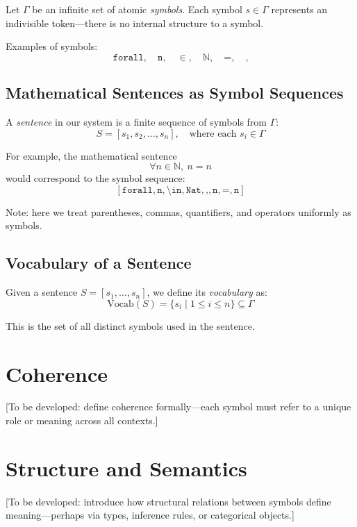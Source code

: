 \documentclass{article}
\theoremstyle{definition}
\begin{document}
Let $\Gamma$ be an infinite set of atomic \emph{symbols}. Each symbol $s \in \Gamma$ represents an indivisible token—there is no internal structure to a symbol.

Examples of symbols:
\[
\texttt{forall}, \quad \texttt{n}, \quad \in, \quad \mathbb{N}, \quad \texttt{=}, \quad \texttt{,}
\]

\subsection{Mathematical Sentences as Symbol Sequences}

A \emph{sentence} in our system is a finite sequence of symbols from $\Gamma$:
\[
S = [s_1, s_2, \dots, s_n], \quad \text{where each } s_i \in \Gamma
\]

For example, the mathematical sentence
\[
\forall n \in \mathbb{N}, \ n = n
\]
would correspond to the symbol sequence:
\[
[\texttt{forall}, \texttt{n}, \texttt{\textbackslash in}, \texttt{Nat}, \texttt{,}, \texttt{n}, \texttt{=}, \texttt{n}]
\]

Note: here we treat parentheses, commas, quantifiers, and operators uniformly as symbols.

\subsection{Vocabulary of a Sentence}

Given a sentence $S = [s_1, \dots, s_n]$, we define its \emph{vocabulary} as:
\[
\mathrm{Vocab}(S) = \{ s_i \mid 1 \leq i \leq n \}
\subseteq \Gamma
\]

This is the set of all distinct symbols used in the sentence.

\section{Coherence}

[To be developed: define coherence formally—each symbol must refer to a unique role or meaning across all contexts.]

\section{Structure and Semantics}

[To be developed: introduce how structural relations between symbols define meaning—perhaps via types, inference rules, or categorical objects.]
\end{document}
